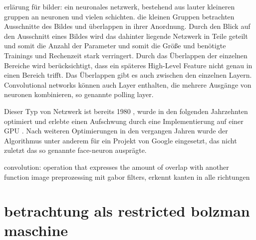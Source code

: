 erlärung für bilder:
ein neuronales netzwerk, bestehend aus lauter kleineren gruppen an neuronen und vielen schichten. die kleinen Gruppen betrachten Ausschnitte des Bildes und überlappen in ihrer Anordnung. Durch den Blick auf den Ausschnitt eines Bildes wird das dahinter liegende Netzwerk in Teile geteilt und somit die Anzahl der Parameter und somit die Größe und benötigte Trainings und Rechenzeit stark verringert. Durch das Überlappen der einzelnen Bereiche wird berücksichtigt, dass ein späteres High-Level Feature nicht genau in einen Bereich trifft.
Das Überlappen gibt es auch zwischen den einzelnen Layern.
Convolutional networks können auch Layer enthalten, die mehrere Ausgänge von neuronen kombinieren, so genannte polling layer.

Dieser Typ von Netzwerk ist bereits 1980 , wurde in den folgenden Jahrzehnten optimiert und erlebte einen Aufschwung durch eine Implementierung auf einer GPU . Nach weiteren Optimierungen in den vergangen Jahren wurde der Algorithmus unter anderem für ein Projekt von Google  eingesetzt, das nicht zuletzt das so genannte face-neuron ausprägte.

convolution: operation that expresses the amount of overlap with another function
image preprozessing mit gabor filters, erkennt kanten in alle richtungen



\section{betrachtung als restricted bolzman maschine}


